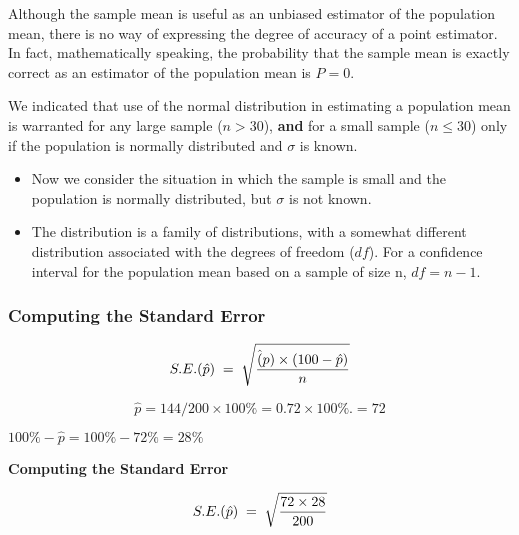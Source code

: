 {{%

Although the sample mean is useful as an unbiased estimator of the population mean, there is no way of
expressing the degree of accuracy of a point estimator. In fact, mathematically speaking, the probability that the
sample mean is exactly correct as an estimator of the population mean is $P = 0$.



We indicated that use of the normal distribution in estimating a population mean is warranted
for any large sample ($n > 30$), \textbf{and} for a small sample ($n \leq 30$) only if the population is normally distributed
and $\sigma$ is known.


\begin{itemize}
\item Now we consider the situation in which the sample is small and the population is normally distributed,
but $\sigma$ is not known.
\item The distribution is a family of distributions, with
a somewhat different distribution associated with the degrees of freedom ($df$). For a confidence interval for the
population mean based on a sample of size n, $df = n - 1$.
\end{itemize}

{

\subsubsection{Computing the Standard Error}

\[
S.E. (\hat{p}) \;=\; \sqrt{ {\hat(p) \times (100 -\hat{p} )\over n}}
\]



\[
\hat{p} = {144/200}  \times 100\%  = 0.72 \times 100\%.  = 72%
\]

$100\% - \hat{p} = 100\% - 72\% = 28\% $

}


{
\textbf{Computing the Standard Error}

\[
S.E. (\hat{p}) \;=\; \sqrt{ {72 \times 28 \over 200 }}
\]


}}}
